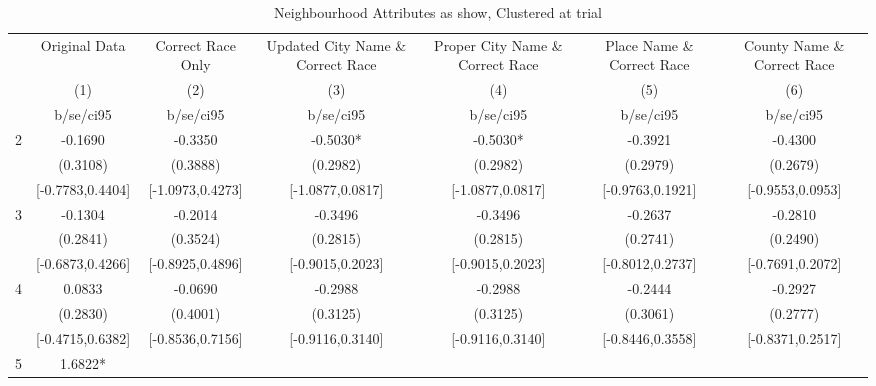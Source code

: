 \documentclass{article}
\begin{document}
\begin{table}[htbp]\centering
\def\sym#1{\ifmmode^{#1}\else\(^{#1}\)\fi}
\caption{Neighbourhood Attributes as show, Clustered at trial}
\begin{tabular}{l*{6}{c}}
\toprule
                    &\multicolumn{1}{c}{Original Data}&\multicolumn{1}{c}{Correct Race Only}&\multicolumn{1}{c}{Updated City Name \& Correct Race}&\multicolumn{1}{c}{Proper City Name \& Correct Race}&\multicolumn{1}{c}{Place Name \& Correct Race}&\multicolumn{1}{c}{County Name \& Correct Race}\\\cmidrule(lr){2-2}\cmidrule(lr){3-3}\cmidrule(lr){4-4}\cmidrule(lr){5-5}\cmidrule(lr){6-6}\cmidrule(lr){7-7}
                    &\multicolumn{1}{c}{(1)}   &\multicolumn{1}{c}{(2)}   &\multicolumn{1}{c}{(3)}   &\multicolumn{1}{c}{(4)}   &\multicolumn{1}{c}{(5)}   &\multicolumn{1}{c}{(6)}   \\
                    &   b/se/ci95   &   b/se/ci95   &   b/se/ci95   &   b/se/ci95   &   b/se/ci95   &   b/se/ci95   \\
\midrule
2                   &     -0.1690   &     -0.3350   &     -0.5030*  &     -0.5030*  &     -0.3921   &     -0.4300   \\
                    &    (0.3108)   &    (0.3888)   &    (0.2982)   &    (0.2982)   &    (0.2979)   &    (0.2679)   \\
                    &[-0.7783,0.4404]   &[-1.0973,0.4273]   &[-1.0877,0.0817]   &[-1.0877,0.0817]   &[-0.9763,0.1921]   &[-0.9553,0.0953]   \\
3                   &     -0.1304   &     -0.2014   &     -0.3496   &     -0.3496   &     -0.2637   &     -0.2810   \\
                    &    (0.2841)   &    (0.3524)   &    (0.2815)   &    (0.2815)   &    (0.2741)   &    (0.2490)   \\
                    &[-0.6873,0.4266]   &[-0.8925,0.4896]   &[-0.9015,0.2023]   &[-0.9015,0.2023]   &[-0.8012,0.2737]   &[-0.7691,0.2072]   \\
4                   &      0.0833   &     -0.0690   &     -0.2988   &     -0.2988   &     -0.2444   &     -0.2927   \\
                    &    (0.2830)   &    (0.4001)   &    (0.3125)   &    (0.3125)   &    (0.3061)   &    (0.2777)   \\
                    &[-0.4715,0.6382]   &[-0.8536,0.7156]   &[-0.9116,0.3140]   &[-0.9116,0.3140]   &[-0.8446,0.3558]   &[-0.8371,0.2517]   \\
5                   &      1.6822*  &               &               &               &               &               \\

\end{tabular}
\end{table}
\end{document}
